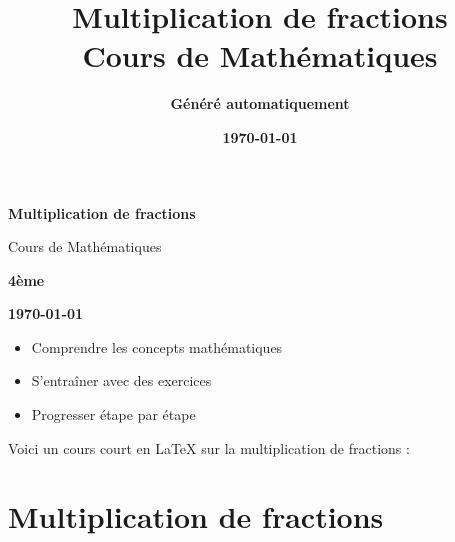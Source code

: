 \documentclass[12pt,a4paper]{article}
\title{\Huge\textcolor{primary}{\textbf{Multiplication de fractions}}\\[0.5cm]
\Large\textcolor{accent}{Cours de Mathématiques}}
\author{\Large\textcolor{secondary}{\textbf{Généré automatiquement}}}
\date{\Large\textcolor{warning}{\textbf{\today}}}
\begin{document}
\begin{titlepage}
\begin{center}
\vspace*{2cm}


\vspace{1cm}

{\Huge\textcolor{primary}{\textbf{Multiplication de fractions}}}

\vspace{0.5cm}

{\Large\textcolor{accent}{Cours de Mathématiques}}

\vspace{1cm}

{\Large\textcolor{secondary}{\textbf{4ème}}}

\vspace{0.5cm}

{\large\textcolor{warning}{\textbf{\today}}}

\vspace{2cm}

\begin{tcolorbox}[colback=lightgray,colframe=success,title=\textbf{\textcolor{success}{Objectifs du cours}}]
\begin{itemize}
\item Comprendre les concepts mathématiques
\item S'entraîner avec des exercices
\item Progresser étape par étape
\end{itemize}
\end{tcolorbox}

\end{center}
\end{titlepage}

\tableofcontents
\newpage

Voici un cours court en LaTeX sur la multiplication de fractions :



\section*{Multiplication de fractions}
\end{document}
